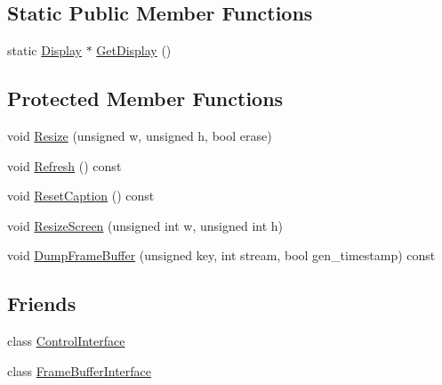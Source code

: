 \subsection*{Static Public Member Functions}
\begin{DoxyCompactItemize}
\item 
static \hyperlink{class_simulator_1_1_display}{Display} $\ast$ \hyperlink{class_simulator_1_1_display_afbff3836d53856e0105e6e68e43b7542}{Get\+Display} ()
\end{DoxyCompactItemize}
\subsection*{Protected Member Functions}
\begin{DoxyCompactItemize}
\item 
void \hyperlink{class_simulator_1_1_display_a9ac001d4d97c472e8921aa6548f9fdfd}{Resize} (unsigned w, unsigned h, bool erase)
\item 
void \hyperlink{class_simulator_1_1_display_acf029f340eff0205cf1c534755ec8f0f}{Refresh} () const 
\item 
void \hyperlink{class_simulator_1_1_display_ad936a0ecf504adc4619a91dc053d6c01}{Reset\+Caption} () const 
\item 
void \hyperlink{class_simulator_1_1_display_a4807e664e7fc47b686e35a999a2e2772}{Resize\+Screen} (unsigned int w, unsigned int h)
\item 
void \hyperlink{class_simulator_1_1_display_afb4959747fcefb5fe4215f180cf6a149}{Dump\+Frame\+Buffer} (unsigned key, int stream, bool gen\+\_\+timestamp) const 
\end{DoxyCompactItemize}
\subsection*{Friends}
\begin{DoxyCompactItemize}
\item 
class \hyperlink{class_simulator_1_1_display_a40db1df984344b6204f9c8a338aacabb}{Control\+Interface}
\item 
class \hyperlink{class_simulator_1_1_display_a8ecdedbbf356339204e1e013df18699b}{Frame\+Buffer\+Interface}
\end{DoxyCompactItemize}


